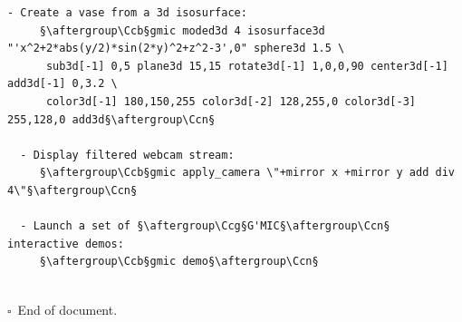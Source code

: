 \documentclass[a4paper,10.5pt,twoside]{book}
\def\Ccb{\color{cb}}
\def\Ccg{\color{cc}}
\def\Ccn{\color{black}}
\begin{document}
\begin{lstlisting}[escapechar=§]
  - Create a vase from a 3d isosurface: 
     §\aftergroup\Ccb§gmic moded3d 4 isosurface3d "'x^2+2*abs(y/2)*sin(2*y)^2+z^2-3',0" sphere3d 1.5 \
      sub3d[-1] 0,5 plane3d 15,15 rotate3d[-1] 1,0,0,90 center3d[-1] add3d[-1] 0,3.2 \
      color3d[-1] 180,150,255 color3d[-2] 128,255,0 color3d[-3] 255,128,0 add3d§\aftergroup\Ccn§ 
 
  - Display filtered webcam stream: 
     §\aftergroup\Ccb§gmic apply_camera \"+mirror x +mirror y add div 4\"§\aftergroup\Ccn§ 
 
  - Launch a set of §\aftergroup\Ccg§G'MIC§\aftergroup\Ccn§ interactive demos: 
     §\aftergroup\Ccb§gmic demo§\aftergroup\Ccn§ 

\end{lstlisting}
\normalsize
 
\printindex 
~\\$\square$~End of document. 
\end{document}
